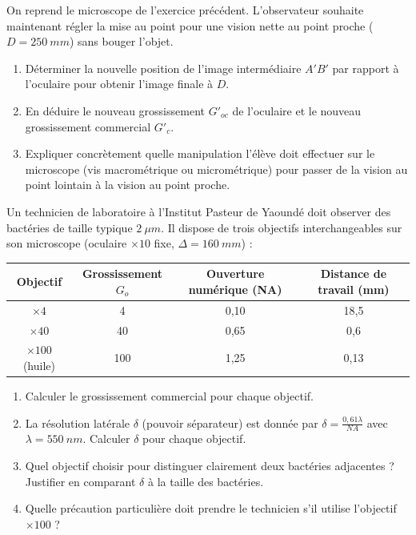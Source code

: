 \documentclass[11pt]{article}
\begin{document}
\begin{exercice}
On reprend le microscope de l'exercice précédent. L'observateur souhaite maintenant régler la mise au point pour une vision nette au point proche ($D = \SI{250}{mm}$) sans bouger l'objet.
\begin{enumerate}
    \item Déterminer la nouvelle position de l'image intermédiaire $A'B'$ par rapport à l'oculaire pour obtenir l'image finale à $D$.
    \item En déduire le nouveau grossissement $G'_{oc}$ de l'oculaire et le nouveau grossissement commercial $G'_c$.
    \item Expliquer concrètement quelle manipulation l'élève doit effectuer sur le microscope (vis macrométrique ou micrométrique) pour passer de la vision au point lointain à la vision au point proche.
\end{enumerate}
\end{exercice}

\begin{exercice}
Un technicien de laboratoire à l'Institut Pasteur de Yaoundé doit observer des bactéries de taille typique $\SI{2}{\mu m}$. Il dispose de trois objectifs interchangeables sur son microscope (oculaire $\times 10$ fixe, $\Delta = \SI{160}{mm}$) :
\begin{center}
\begin{tabular}{|c|c|c|c|}
\hline
Objectif & Grossissement $G_o$ & Ouverture numérique (NA) & Distance de travail (mm) \\
\hline
$\times 4$ & 4 & 0,10 & 18,5 \\
$\times 40$ & 40 & 0,65 & 0,6 \\
$\times 100$ (huile) & 100 & 1,25 & 0,13 \\
\hline
\end{tabular}
\end{center}
\begin{enumerate}
    \item Calculer le grossissement commercial pour chaque objectif.
    \item La résolution latérale $\delta$ (pouvoir séparateur) est donnée par $\delta = \frac{0,61 \lambda}{NA}$ avec $\lambda = \SI{550}{nm}$. Calculer $\delta$ pour chaque objectif.
    \item Quel objectif choisir pour distinguer clairement deux bactéries adjacentes ? Justifier en comparant $\delta$ à la taille des bactéries.
    \item Quelle précaution particulière doit prendre le technicien s'il utilise l'objectif $\times 100$ ?
\end{enumerate}
\end{exercice}
\end{document}
